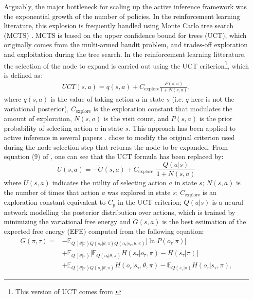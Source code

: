 \documentclass[twoside,11pt]{article}
\begin{document}
Arguably, the major bottleneck for scaling up the active inference framework was the exponential growth of the number of policies. In the reinforcement learning literature, this explosion is frequently handled using Monte Carlo tree search (MCTS) \citep{Go,6145622,MuZero}. MCTS is based on the upper confidence bound for trees (UCT), which originally comes from the multi-armed bandit problem, and trades-off exploration and exploitation during the tree search. In the reinforcement learning litterature, the selection of the node to expand is carried out using the UCT criterion\footnote{This version of UCT comes from \citet{Go}}, which is defined as:
\begin{align}\label{eq:UCT_CRITERIA_ALPHAGO}
UCT(s,a) = q(s,a) + C_{\text{explore}} \frac{P(s,a)}{1+N(s,a)},
\end{align}
where $q(s,a)$ is the value of taking action $a$ in state $s$ (i.e. $q$ here is not the variational posterior), $C_{\text{explore}}$ is the exploration constant that modulates the amount of exploration, $N(s,a)$ is the visit count, and $P(s,a)$ is the prior probability of selecting action $a$ in state $s$. This approach has been applied to active inference in several papers \citep{DeepAIwithMCMC,LargePOMDP}. \citet{DeepAIwithMCMC} chose to modify the original criterion used during the node selection step that returns the node to be expanded. From equation (9) of \citep{DeepAIwithMCMC}, one can see that the UCT formula has been replaced by:
\begin{equation}\label{eq:uct1}
U(s, a) = -\tilde{G}(s, a) + C_{\text{explore}} \,\, \frac{Q(a|s)}{1 + N(s, a)}
\end{equation}
where $U(s, a)$ indicates the utility of selecting action $a$ in state $s$; $N(s, a)$ is the number of times that action $a$ was explored in state $s$; $C_{\text{explore}}$ is an exploration constant equivalent to $C_p$ in the UCT criterion; $Q(a|s)$ is a neural network modelling the posterior distribution over actions, which is trained by minimizing the variational free energy and $\tilde{G}(s, a)$ is the best estimation of the expected free energy (EFE) computed from the following equation:
\begin{align*}
G(\pi, \tau) = &- \mathbb{E}_{Q(\theta|\pi)Q(s_\tau|\theta,\pi)Q(o_\tau|s_\tau,\theta,\pi)}\Big[\ln P(o_\tau|\pi)\Big]\\
&+ \mathbb{E}_{Q(\theta|\pi)}\Big[\mathbb{E}_{Q(o_\tau|\theta,\pi)}H(s_\tau|o_\tau,\pi) - H(s_\tau|\pi)\Big]\\
&+ \mathbb{E}_{Q(\theta|\pi)Q(s_\tau|\theta,\pi)}H(o_\tau|s_\tau,\theta,\pi) - \mathbb{E}_{Q(s_\tau|\pi)}H(o_\tau|s_\tau,\pi),
\end{align*}
\end{document}

